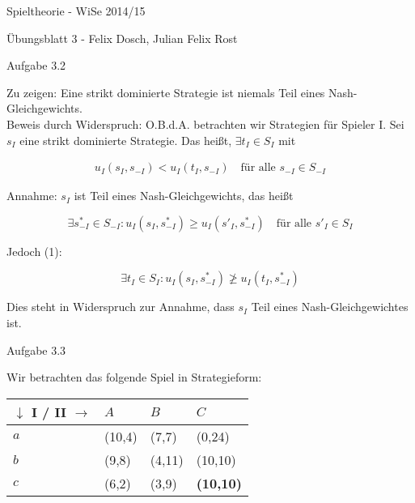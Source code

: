 \documentclass{scrartcl}
\begin{document}
\begin{LARGE}
Spieltheorie - WiSe 2014/15
\end{LARGE}

\begin{Large}
Übungsblatt 3 - Felix Dosch, Julian Felix Rost\\[1.0cm]
\end{Large}

\begin{Large}
Aufgabe 3.2\\[0.0cm]
\end{Large}

Zu zeigen: Eine strikt dominierte Strategie ist niemals Teil eines Nash-Gleichgewichts. \\

Beweis durch Widerspruch: O.B.d.A. betrachten wir Strategien für Spieler I. Sei $s_I$
eine strikt dominierte Strategie. Das heißt, $\exists t_I \in S_I$ mit

\begin{align}
u_I(s_I,s_{-I}) < u_I(t_I,s_{-I}) \quad \text{für alle } s_{-I} \in S_{-I}
\end{align}

Annahme: $s_I$ ist Teil eines Nash-Gleichgewichts, das heißt

\[
\exists s^*_{-I} \in S_{-I} : u_I(s_I,s^*_{-I}) \geq u_I(s'_I,s^*_{-I}) \quad 
\text{für alle } s'_I \in S_I
\]

Jedoch (1):

\[
\exists t_I \in S_I : u_I(s_I,s^*_{-I}) \ngeq u_I(t_I,s^*_{-I})
\]

Dies steht in Widerspruch zur Annahme, dass $s_I$ Teil eines Nash-Gleichgewichtes ist. \\

\begin{Large}
Aufgabe 3.3\\[0.0cm]
\end{Large}

Wir betrachten das folgende Spiel in Strategieform: \\

\begin{tabularx}{0.7\textwidth} {|X|X|X|X|}
\hline
$\downarrow$ I / II $\rightarrow$	& $A$		& $B$		& $C$	\\
\hline
$a$									& (10,4)	& (7,7)		& (0,24)\\
\hline
$b$									& (9,8)		& (4,11)	& (10,10)\\
\hline
$c$									& (6,2)		& (3,9)		& \textbf{(10,10)}\\
\hline
\end{tabularx} \\
\end{document}
